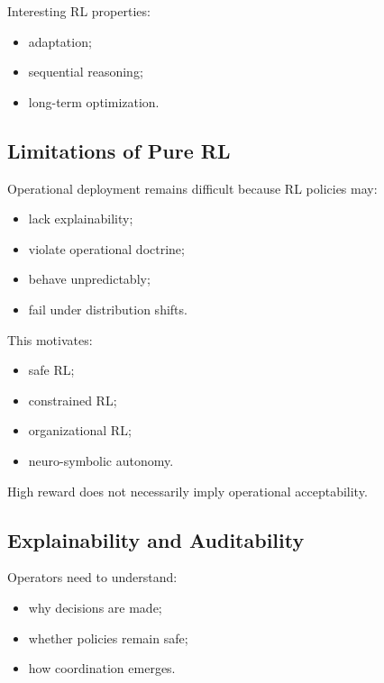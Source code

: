\documentclass[10pt,a4paper,twocolumn]{article}
\begin{document}
Interesting RL properties:
\begin{itemize}
    \item adaptation;
    \item sequential reasoning;
    \item long-term optimization.
\end{itemize}


\subsection{Limitations of Pure RL}

Operational deployment remains difficult because RL policies may:
\begin{itemize}
    \item lack explainability;
    \item violate operational doctrine;
    \item behave unpredictably;
    \item fail under distribution shifts.
\end{itemize}

This motivates:
\begin{itemize}
    \item safe RL;
    \item constrained RL;
    \item organizational RL;
    \item neuro-symbolic autonomy.
\end{itemize}

\begin{warningbox}
    High reward does not necessarily imply operational acceptability.
\end{warningbox}


\subsection{Explainability and Auditability}

Operators need to understand:
\begin{itemize}
    \item why decisions are made;
    \item whether policies remain safe;
    \item how coordination emerges.
\end{itemize}
\end{document}
